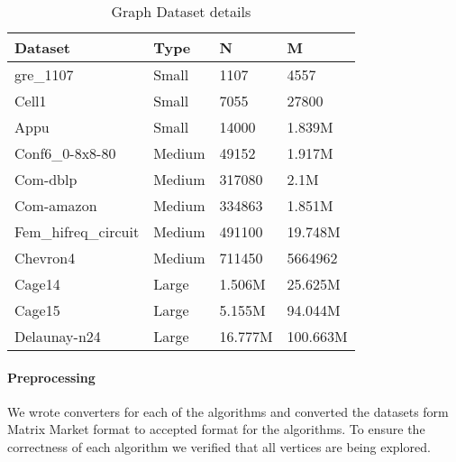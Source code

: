 \begin{table}[th]
\begin{center} %
    \begin{tabular}{| l | l | l | l |}
    \hline
	Dataset & Type & N & M\\ \hline
    \hline
    	gre\_1107 & Small & 1107 & 4557\\ \hline
	Cell1 & Small & 7055 & 27800\\ \hline
	Appu & Small & 14000 & 1.839M\\ \hline

	Conf6\_0-8x8-80 & Medium & 49152 & 1.917M\\ \hline
	Com-dblp  & Medium & 317080 & 2.1M\\ \hline
	Com-amazon & Medium & 334863 & 1.851M\\ \hline
	Fem\_hifreq\_circuit & Medium & 491100 & 19.748M\\ \hline
	Chevron4 & Medium & 711450 & 5664962\\ \hline

	Cage14 & Large & 1.506M & 25.625M\\ \hline
	Cage15 & Large & 5.155M & 94.044M\\ \hline
	Delaunay-n24 & Large & 16.777M & 100.663M\\ \hline
    \end{tabular}
\end{center}
\caption{\capfont Graph Dataset details}
\label{tab:Table2}
\end{table}

\paragraph{Preprocessing}
We wrote converters for each of the algorithms and converted the
datasets form Matrix Market format to accepted format for the
algorithms.  To ensure the correctness of each algorithm we verified
that all vertices are being explored.

